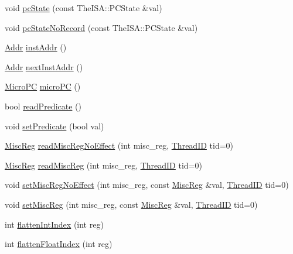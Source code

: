 \begin{DoxyCompactItemize}
\item 
void \hyperlink{classSimpleThread_a5e9cfc754c9ef9b7db875ce89871944e}{pcState} (const TheISA::PCState \&val)
\item 
void \hyperlink{classSimpleThread_a6005386aeeaecb35499c3199fb47ba2f}{pcStateNoRecord} (const TheISA::PCState \&val)
\item 
\hyperlink{base_2types_8hh_af1bb03d6a4ee096394a6749f0a169232}{Addr} \hyperlink{classSimpleThread_a53c92716db281ae16ffb693c6d7803c7}{instAddr} ()
\item 
\hyperlink{base_2types_8hh_af1bb03d6a4ee096394a6749f0a169232}{Addr} \hyperlink{classSimpleThread_aceec6e28772f91b3cc921c0e3927b0c2}{nextInstAddr} ()
\item 
\hyperlink{base_2types_8hh_adfb4d8b20c5abc8be73dd367b16f2d57}{MicroPC} \hyperlink{classSimpleThread_a1a21696f33a7d38f251687ae0b5e9718}{microPC} ()
\item 
bool \hyperlink{classSimpleThread_a254cecc48d457ea298b08a8bb009f9cf}{readPredicate} ()
\item 
void \hyperlink{classSimpleThread_a137a8c6cced89c2ff8387900439436b4}{setPredicate} (bool val)
\item 
\hyperlink{classSimpleThread_aaf5f073a387db0556d1db4bcc45428bc}{MiscReg} \hyperlink{classSimpleThread_af2ec8925148a53b9bddefb7fb65a7223}{readMiscRegNoEffect} (int misc\_\-reg, \hyperlink{base_2types_8hh_ab39b1a4f9dad884694c7a74ed69e6a6b}{ThreadID} tid=0)
\item 
\hyperlink{classSimpleThread_aaf5f073a387db0556d1db4bcc45428bc}{MiscReg} \hyperlink{classSimpleThread_a71d44ee14eeab530a09bc7d68d97ece2}{readMiscReg} (int misc\_\-reg, \hyperlink{base_2types_8hh_ab39b1a4f9dad884694c7a74ed69e6a6b}{ThreadID} tid=0)
\item 
void \hyperlink{classSimpleThread_ab8dd4afdd4e652ca191b235505691f68}{setMiscRegNoEffect} (int misc\_\-reg, const \hyperlink{classSimpleThread_aaf5f073a387db0556d1db4bcc45428bc}{MiscReg} \&val, \hyperlink{base_2types_8hh_ab39b1a4f9dad884694c7a74ed69e6a6b}{ThreadID} tid=0)
\item 
void \hyperlink{classSimpleThread_a9b618db833e56fbb32246fe25716846f}{setMiscReg} (int misc\_\-reg, const \hyperlink{classSimpleThread_aaf5f073a387db0556d1db4bcc45428bc}{MiscReg} \&val, \hyperlink{base_2types_8hh_ab39b1a4f9dad884694c7a74ed69e6a6b}{ThreadID} tid=0)
\item 
int \hyperlink{classSimpleThread_aa529f2d70520c578e3e29b3bf1a66312}{flattenIntIndex} (int reg)
\item 
int \hyperlink{classSimpleThread_ab9ea3f8f1a21df875c7273c7377dfac1}{flattenFloatIndex} (int reg)

\end{DoxyCompactItemize}
